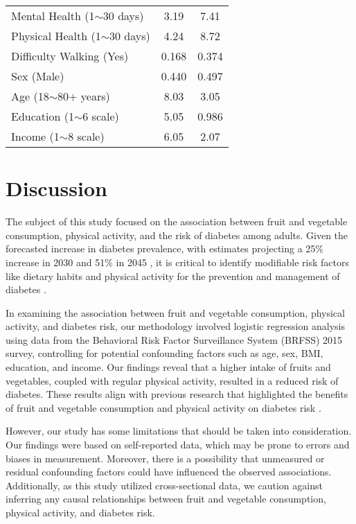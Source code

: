 \documentclass[11pt]{article}
\begin{document}
\begin{table}[!htbp]
\begin{tabular}{l c c}
Mental Health (1$\sim$30 days)   & 3.19                & 7.41                        \\
Physical Health (1$\sim$30 days) & 4.24                & 8.72                        \\
Difficulty Walking (Yes)         & 0.168               & 0.374                       \\
Sex (Male)                       & 0.440               & 0.497                       \\
Age (18$\sim$80+ years)          & 8.03                & 3.05                        \\
Education (1$\sim$6 scale)       & 5.05                & 0.986                       \\
Income (1$\sim$8 scale)          & 6.05                & 2.07                        \\
\bottomrule
\end{tabular}
\end{table}

\section*{Discussion}

The subject of this study focused on the association between fruit and vegetable consumption, physical activity, and the risk of diabetes among adults. Given the forecasted increase in diabetes prevalence, with estimates projecting a 25\% increase in 2030 and 51\% in 2045 \cite{Saeedi2019GlobalAR}, it is critical to identify modifiable risk factors like dietary habits and physical activity for the prevention and management of diabetes \cite{Uloko2018PrevalenceAR}. 

In examining the association between fruit and vegetable consumption, physical activity, and diabetes risk, our methodology involved logistic regression analysis using data from the Behavioral Risk Factor Surveillance System (BRFSS) 2015 survey, controlling for potential confounding factors such as age, sex, BMI, education, and income. Our findings reveal that a higher intake of fruits and vegetables, coupled with regular physical activity, resulted in a reduced risk of diabetes. These results align with previous research that highlighted the benefits of fruit and vegetable consumption and physical activity on diabetes risk \cite{Herbst2007ImpactOP, Carlström2018CoffeeCA, Drouin-Chartier2016SystematicRO}.

However, our study has some limitations that should be taken into consideration. Our findings were based on self-reported data, which may be prone to errors and biases in measurement. Moreover, there is a possibility that unmeasured or residual confounding factors could have influenced the observed associations. Additionally, as this study utilized cross-sectional data, we caution against inferring any causal relationships between fruit and vegetable consumption, physical activity, and diabetes risk. 
\end{document}
